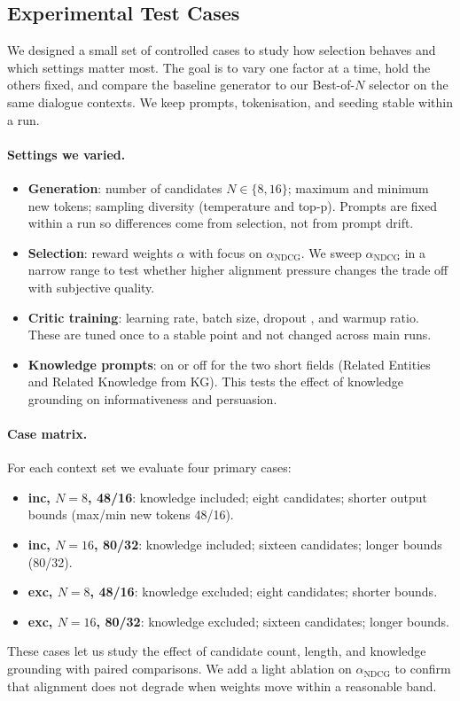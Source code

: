 \documentclass[12pt]{article}
\begin{document}
  \subsection{Experimental Test Cases}
  We designed a small set of controlled cases to study how selection behaves and which settings matter most. The goal is to vary one factor at a time, hold the others fixed, and compare the baseline generator to our Best-of-$N$ selector on the same dialogue contexts. We keep prompts, tokenisation, and seeding stable within a run.
  
  \paragraph{Settings we varied.}
  \begin{itemize}[leftmargin=*]
    \item \textbf{Generation}: number of candidates $N\in\{8,16\}$; maximum and minimum new tokens; sampling diversity (temperature and top-p). Prompts are fixed within a run so differences come from selection, not from prompt drift.
    \item \textbf{Selection}: reward weights $\alpha$ with focus on $\alpha_{\mathrm{NDCG}}$. We sweep $\alpha_{\mathrm{NDCG}}$ in a narrow range to test whether higher alignment pressure changes the trade off with subjective quality.
    \item \textbf{Critic training}: learning rate, batch size, dropout \citep{srivastava2014dropout}, and warmup ratio. These are tuned once to a stable point and not changed across main runs.
    \item \textbf{Knowledge prompts}: on or off for the two short fields (Related Entities and Related Knowledge from KG). This tests the effect of knowledge grounding on informativeness and persuasion.
  \end{itemize}
  
  \paragraph{Case matrix.} For each context set we evaluate four primary cases:
  \begin{itemize}[leftmargin=*]
    \item \textbf{inc, $N=8$, 48/16}: knowledge included; eight candidates; shorter output bounds (max/min new tokens 48/16).
    \item \textbf{inc, $N=16$, 80/32}: knowledge included; sixteen candidates; longer bounds (80/32).
    \item \textbf{exc, $N=8$, 48/16}: knowledge excluded; eight candidates; shorter bounds.
    \item \textbf{exc, $N=16$, 80/32}: knowledge excluded; sixteen candidates; longer bounds.
  \end{itemize}
  These cases let us study the effect of candidate count, length, and knowledge grounding with paired comparisons. We add a light ablation on $\alpha_{\mathrm{NDCG}}$ to confirm that alignment does not degrade when weights move within a reasonable band.
  
\end{document}
